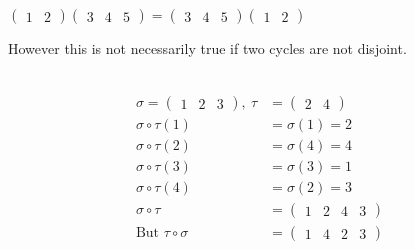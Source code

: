 \begin{example}
$\begin{pmatrix}1 & 2\end{pmatrix} \begin{pmatrix}3 & 4 & 5\end{pmatrix} = \begin{pmatrix}3 & 4 & 5\end{pmatrix} \begin{pmatrix}1 & 2\end{pmatrix}$
\end{example}

However this is not necessarily true if two cycles are not disjoint.

\begin{example} ~\vspace*{-1.5\baselineskip}
\begin{align*}
    \sigma = \begin{pmatrix}1 & 2 & 3\end{pmatrix},\ \tau &= \begin{pmatrix}2 & 4\end{pmatrix} \\
    \sigma \circ \tau(1) &= \sigma(1) = 2 \\
    \sigma \circ \tau(2) &= \sigma(4) = 4 \\
    \sigma \circ \tau(3) &= \sigma(3) = 1 \\
    \sigma \circ \tau(4) &= \sigma(2) = 3 \\
    \sigma \circ \tau &= \begin{pmatrix}1 & 2 & 4 & 3\end{pmatrix} \\
    \text{But } \tau \circ \sigma &= \begin{pmatrix} 1 & 4 & 2 & 3 \end{pmatrix}
\end{align*}
\end{example}

